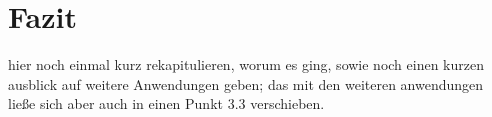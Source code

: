 \section{Fazit}
%
hier noch einmal kurz rekapitulieren, worum es ging, sowie noch einen kurzen ausblick auf weitere Anwendungen geben; das mit den weiteren anwendungen ließe sich aber auch in einen Punkt 3.3 verschieben.
